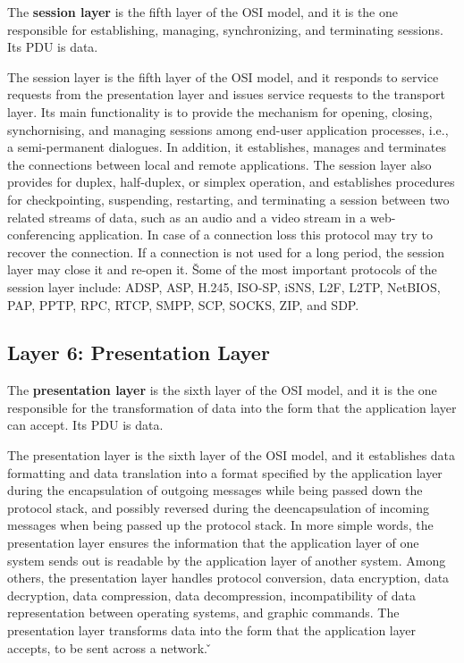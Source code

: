 The \textbf{session layer} is the fifth layer of the OSI model, and it is the one responsible for establishing,
managing, synchronizing, and terminating sessions. Its PDU is data.
\ed

The session layer is the fifth layer of the OSI model, and it responds to service requests from the presentation
layer and issues service requests to the transport layer. Its main functionality is to provide the mechanism for
opening, closing, synchornising, and managing sessions among end-user application processes, i.e., a semi-permanent
dialogues. In addition, it establishes, manages and terminates the connections between local and remote applications.
The session layer also provides for duplex, half-duplex, or simplex operation, and establishes procedures for
checkpointing, suspending, restarting, and terminating a session between two related streams of data, such as an audio
and a video stream in a web-conferencing application. In case of a connection loss this protocol may try to recover the
connection. If a connection is not used for a long period, the session layer may close it and re-open it. \v

Some of the most important protocols of the session layer include: ADSP, ASP, H.245, ISO-SP, iSNS, L2F, L2TP, NetBIOS,
PAP, PPTP, RPC, RTCP, SMPP, SCP, SOCKS, ZIP, and SDP\@.

\subsection{Layer 6: Presentation Layer}

The \textbf{presentation layer} is the sixth layer of the OSI model, and it is the one responsible for the
transformation of data into the form that the application layer can accept. Its PDU is data.
\ed

The presentation layer is the sixth layer of the OSI model, and it establishes data formatting and data translation
into a format specified by the application layer during the encapsulation of outgoing messages while being passed
down the protocol stack, and possibly reversed during the deencapsulation of incoming messages when being passed up
the protocol stack. In more simple words, the presentation layer ensures the information that the application layer
of one system sends out is readable by the application layer of another system. Among others, the presentation layer
handles protocol conversion, data encryption, data decryption, data compression, data decompression, incompatibility
of data representation between operating systems, and graphic commands. The presentation layer transforms data into
the form that the application layer accepts, to be sent across a network. \v

